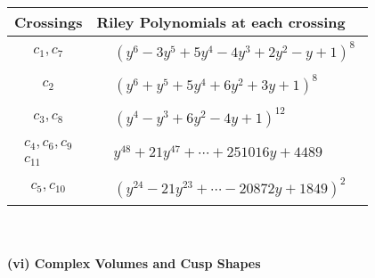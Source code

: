 \documentclass[1p]{elsarticle_modified}
\theoremstyle{definition}
\begin{document}
\begin{tabular}{m{50pt}|m{274pt}}
Crossings & \hspace{64pt}Riley Polynomials at each crossing \\
\hline $$\begin{aligned}c_{1},c_{7}\end{aligned}$$&$\begin{aligned}
&(y^6-3 y^5+5 y^4-4 y^3+2 y^2- y+1)^8
\end{aligned}$\\
\hline $$\begin{aligned}c_{2}\end{aligned}$$&$\begin{aligned}
&(y^6+y^5+5 y^4+6 y^2+3 y+1)^8
\end{aligned}$\\
\hline $$\begin{aligned}c_{3},c_{8}\end{aligned}$$&$\begin{aligned}
&(y^4- y^3+6 y^2-4 y+1)^{12}
\end{aligned}$\\
\hline $$\begin{aligned}c_{4},c_{6},c_{9}\\c_{11}\end{aligned}$$&$\begin{aligned}
&y^{48}+21 y^{47}+\cdots+251016 y+4489
\end{aligned}$\\
\hline $$\begin{aligned}c_{5},c_{10}\end{aligned}$$&$\begin{aligned}
&(y^{24}-21 y^{23}+\cdots-20872 y+1849)^{2}
\end{aligned}$\\
\hline
\end{tabular}\\~\\
\newpage\flushleft \textbf{(vi) Complex Volumes and Cusp Shapes}
\end{document}
